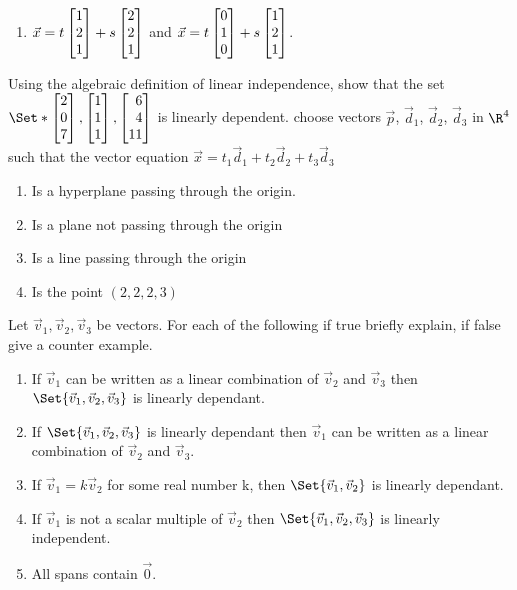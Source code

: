 \begin{exercises}
\begin{problist}
\begin{enumerate}
			\item $\vec x = t\mat{1\\2\\1} + s\mat{2\\2\\1}$ and
						$\vec x = t\mat{0\\1\\0} + s\mat{1\\2\\1}$.
		\end{enumerate}
		\prob
		Using the algebraic definition of linear independence, show that the set
		$\Set*{\mat{2\\0\\7},\mat{1\\1\\1},\mat{6\\4\\11}}$ is linearly dependent.
		\prob
		choose vectors $\vec p$, $\vec d_1$, $\vec d_2$, $\vec d_3$ in $\R^4$ such that
		the vector equation $\vec x = t_1\vec d_1 + t_2\vec d_2 + t_3\vec d_3$
		\begin{enumerate}
			\item Is a hyperplane passing through the origin.
			\item Is a plane not passing through the origin
			\item Is a line passing through the origin
			\item Is the point $(2,2,2,3)$
		\end{enumerate}
		\prob
		Let $\vec v_1, \vec v_2, \vec v_3$ be vectors. For each of the following
		if true briefly explain, if false give a counter example.
		\begin{enumerate}
			\item If $\vec v_1$ can be written as a linear combination of $\vec v_2$ and
			$\vec v_3$ then $\Set{\vec v_1,\vec v_2,\vec v_3}$ is linearly dependant.
			\item If $\Set{\vec v_1,\vec v_2,\vec v_3}$ is linearly dependant then
			$\vec v_1$ can be written as a linear combination of $\vec v_2$ and $\vec v_3$.
			\item If $\vec v_1=k\vec v_2$ for some real number k, then $\Set{\vec v_1,\vec v_2}$
			is linearly dependant.
			\item If $\vec v_1$ is not a scalar multiple of $\vec v_2$ then
			$\Set{\vec v_1,\vec v_2,\vec v_3}$ is linearly independent.
			\item All spans contain $\vec 0$.
		\end{enumerate}
	\end{problist}\item
\end{exercises}
